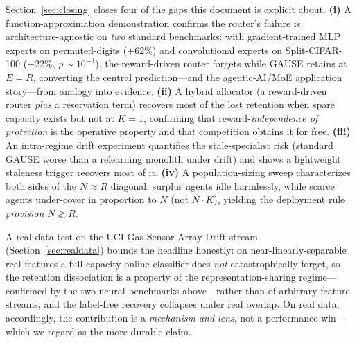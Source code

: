 \documentclass[10pt]{article}
\begin{document}
Section~\ref{sec:closing} closes four of the gaps this document is explicit about.
\textbf{(i)} A function-approximation demonstration confirms the router's failure is
architecture-agnostic on \emph{two} standard benchmarks: with gradient-trained MLP
experts on permuted-digits ($+62\%$) and convolutional experts on Split-CIFAR-100
($+22\%$, $p\sim10^{-3}$), the reward-driven router forgets while GAUSE retains at
$E{=}R$, converting the central prediction---and the agentic-AI/MoE application
story---from analogy into evidence. \textbf{(ii)} A hybrid allocator (a reward-driven
router \emph{plus} a reservation term) recovers most of the lost retention when spare
capacity exists but not at $K{=}1$, confirming that reward-\emph{independence of
protection} is the operative property and that competition obtains it for free.
\textbf{(iii)} An intra-regime drift experiment quantifies the stale-specialist risk
(standard GAUSE worse than a relearning monolith under drift) and shows a lightweight
staleness trigger recovers most of it. \textbf{(iv)} A population-sizing sweep
characterizes both sides of the $N\approx R$ diagonal: surplus agents idle harmlessly,
while scarce agents under-cover in proportion to $N$ (not $N\!\cdot\!K$), yielding the
deployment rule \emph{provision $N\gtrsim R$}.

A real-data test on the UCI Gas Sensor Array Drift stream
(Section~\ref{sec:realdata}) bounds the headline honestly: on near-linearly-separable
real features a full-capacity online classifier does \emph{not} catastrophically
forget, so the retention dissociation is a property of the representation-sharing
regime---confirmed by the two neural benchmarks above---rather than of arbitrary
feature streams, and the label-free recovery collapses under real overlap. On real
data, accordingly, the contribution is a \emph{mechanism and lens}, not a performance
win---which we regard as the more durable claim.
\end{document}
